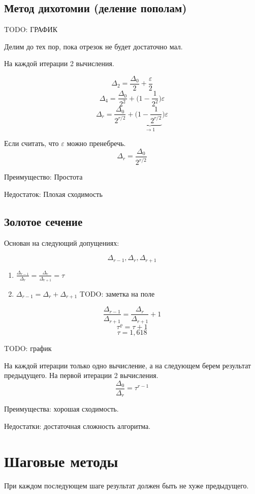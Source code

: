 \documentclass[12pt,a5paper]{scrbook}
\begin{document}
  \subsection{Метод дихотомии (деление пополам)}
  TODO: ГРАФИК
  \par
  Делим до тех пор, пока отрезок не будет достаточно мал.
  \par
  На каждой итерации 2 вычисления.
  \par
  $$\Delta_2 = \frac{\Delta_0}{2} + \frac{\varepsilon}{2}$$
  $$\Delta_4 = \frac{\Delta_0}{2^2} + \bigg(1 - \frac{1}{2^2}\bigg)\varepsilon$$
  $$\Delta_r = \frac{\Delta_0}{2^{r/2}} + \bigg(\underbrace{1 - \frac{1}{2^{r/2}}}_{\rightarrow 1}\bigg)\varepsilon$$
  \par
  Если считать, что $\varepsilon$ можно пренебречь.
  $$\Delta_r = \frac{\Delta_0}{2^{r/2}}$$
  \par
  Преимущество: Простота
  \par
  Недостаток: Плохая сходимость
  \subsection{Золотое сечение}
  Основан на следующий допущениях:
  \par
  $$\Delta_{r-1}, \Delta_r, \Delta_{r+1}$$
  \par
  \begin{enumerate}
    \item $\frac{\Delta_{r-1}}{\Delta_r} = \frac{\Delta_r}{\Delta_{r+1}} = \tau$
    \item $\Delta_{r-1} = \Delta_r + \Delta_{r+1}$
    TODO: заметка на поле
  \end{enumerate}
  $$\frac{\Delta_{r-1}}{\Delta_{r+1}} = \frac{\Delta_r}{\Delta_{r+1}} + 1$$
  $$\tau^\varrho = \tau + 1$$
  $$\tau = 1,618$$
  \par
  TODO: график
  \par
  На каждой итерации только одно вычисление, а на следующем берем результат предыдущего. На первой итерации 2 вычисления.
  $$\frac{\Delta_0}{\Delta_r} = \tau^{r-1}$$
  \par
  Преимущества: хорошая сходимость.
  \par
  Недостатки: достаточная сложность алгоритма.
  \section{Шаговые методы}
  При каждом последующем шаге результат должен быть не хуже предыдущего.
  \par
\end{document}
